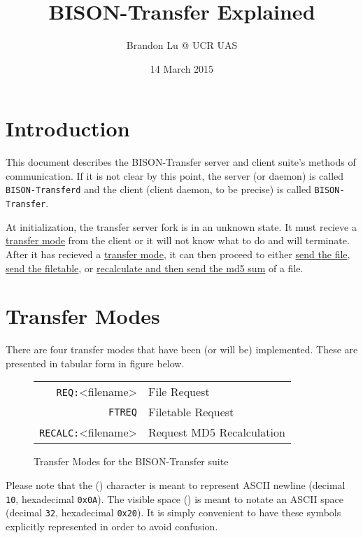 \documentclass[12pt]{article}
\author{Brandon Lu @ UCR UAS}
\title{BISON-Transfer Explained}
\date{14 March 2015}
\begin{document}
\maketitle
\section{Introduction}
This document describes the BISON-Transfer server and client suite's methods
of communication.  If it is not clear by this point, the server (or daemon)
is called \verb+BISON-Transferd+ and the client (client daemon, to be precise)
is called \verb+BISON-Transfer+.

At initialization, the transfer server fork is in an unknown state.  It must
recieve a \hyperref[sec:Transfer Modes]{transfer mode} from the client or it
will not know what to
do and will terminate.
After it has recieved a \hyperref[sec:Transfer Modes]{transfer mode}, it can
then proceed to either \hyperref[ssec:Request File]{send the file},
\hyperref[ssec:Request Filetable]{send the filetable},
or \hyperref[ssec:Recalculate MD5]
{recalculate and then send the md5 sum} of a file. 

\tableofcontents

\section{Transfer Modes}
\label{sec:Transfer Modes}
There are four transfer modes that have been (or will be) implemented.
These are presented in tabular form in figure below.
\begin{figure}[h!]
	\centering
	\begin{tabular}{r l}
		\verb+REQ:+\textvisiblespace <filename>\carriagereturn\carriagereturn
		& File Request\\
		\verb+FTREQ+\carriagereturn\carriagereturn & Filetable Request \\
		\verb+RECALC:+\textvisiblespace <filename>\carriagereturn
		\carriagereturn & Request MD5 Recalculation
	\end{tabular}
	\label{fig:Transfer Modes}
	\caption{Transfer Modes for the BISON-Transfer suite}
\end{figure}

Please note that the (\carriagereturn) character is meant to represent ASCII
newline (decimal \verb+10+, hexadecimal \verb+0x0A+).  The
visible space (\textvisiblespace) is meant to notate an ASCII space (decimal
\verb+32+, hexadecimal \verb+0x20+).
It is simply convenient to have these symbols explicitly represented in order
to avoid confusion.
\end{document}
